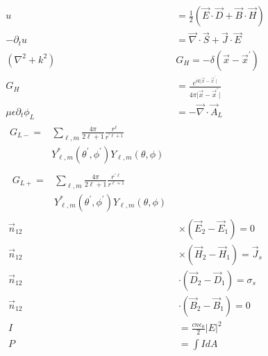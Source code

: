 \documentclass[12pt]{article}
\begin{document}
\begin{multicols}{3}
\begin{align}
  u &= \frac{1}{2}(\vec{E} \cdot \vec{D} + \vec{B} \cdot \vec{H})\\
  -\partial_t u &= \vec{\nabla} \cdot \vec{S} + \vec{J} \cdot \vec{E}\\
  (\nabla^2 + k^2) &G_{H} =
  -\delta(\vec{x} - \vec{x}^{\prime})\\
  G_H &= \frac{e^{ik\lvert \vec{x}
      - \vec{x}^{\prime} \rvert}}{4\pi \lvert \vec{x} - \vec{x}^{\prime} \rvert}\\
  \mu \epsilon \partial_t \phi_L &= -\vec{\nabla} \cdot \vec{A}_L\\
  \begin{split}
    G_{L-} = &\textstyle{\sum\limits_{\ell, m}} {}\frac{4\pi}{2\ell + 1} \frac{r^{\ell}}{r^{\prime \ell + 1}}\\
    &Y^{*}_{\ell, m}(\theta^{\prime}, \phi^{\prime})
  Y_{\ell, m}(\theta, \phi)
  \end{split}
\end{align}
\begin{align}
  \begin{split}
  G_{L+} = &{}\textstyle{\sum\limits_{\ell, m}}
  \frac{4\pi}{2\ell + 1} \frac{r^{\prime \ell}}{r^{\ell + 1}}\\
  &Y^{*}_{\ell, m}(\theta^{\prime}, \phi^{\prime})
  Y_{\ell, m}(\theta, \phi)
  \end{split}\\
  \vec{n}_{12} &\times (\vec{E}_2 - \vec{E}_1) = 0\\
  \vec{n}_{12} &\times (\vec{H}_2 - \vec{H}_1) = \vec{J}_s\\
  \vec{n}_{12} &\cdot (\vec{D}_2 - \vec{D}_1) = \sigma_s\\
  \vec{n}_{12} &\cdot (\vec{B}_2 - \vec{B}_1) = 0\\
  I &= \frac{c n \epsilon_0}{2} \lvert E \rvert^2\\
  P &= \int I dA
\end{align}


\end{multicols}
\end{document}
